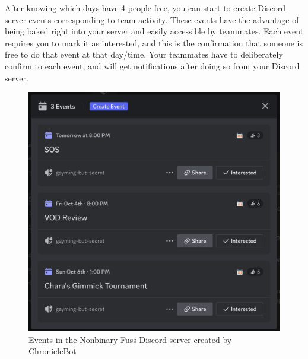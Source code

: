 \documentclass[12pt]{article}
\begin{document}
After knowing which days have 4 people free, you can start to create Discord server events corresponding to team activity. These events have the advantage of being baked right into your server and easily accessible by teammates. Each event requires you to mark it as interested, and this is the confirmation that someone is free to do that event at that day/time. Your teammates have to deliberately confirm to each event, and will get notifications after doing so from your Discord server. 
\begin{figure}
    \centering
    \includegraphics[width=0.6\linewidth]{discord_events.png}
\caption{Events in the Nonbinary Fuss Discord server created by ChronicleBot}
\end{figure}
\end{document}
